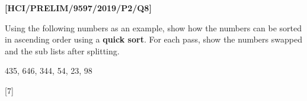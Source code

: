 \item \textbf{{[}HCI/PRELIM/9597/2019/P2/Q8{]} }

Using the following numbers as an example, show how the numbers can
be sorted in ascending order using a \textbf{quick sort}. For each
pass, show the numbers swapped and the sub lists after splitting. 
\noindent \begin{center}
435, 646, 344, 54, 23, 98
\par\end{center}

\noindent \begin{flushleft}
\hfill{}{[}7{]}
\par\end{flushleft}